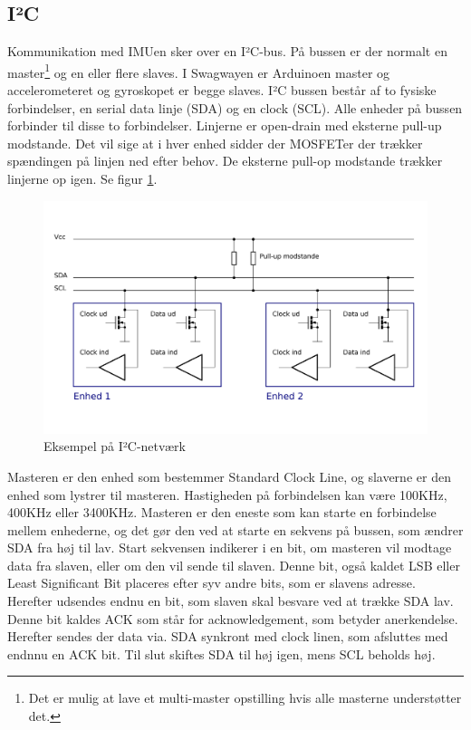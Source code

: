 \documentclass[a4paper,oneside,article,danish,table]{memoir}
\begin{document}
\subsection{I²C}
Kommunikation med IMUen sker over en I²C-bus. På bussen er der normalt en master\footnote{Det er mulig at lave et multi-master opstilling hvis alle masterne understøtter det.} og en eller flere slaves. I Swagwayen er Arduinoen master og accelerometeret og gyroskopet er begge slaves. I²C bussen består af to fysiske forbindelser, en serial data linje (SDA) og en clock (SCL). Alle enheder på bussen forbinder til disse to forbindelser. Linjerne er open-drain med eksterne pull-up modstande. Det vil sige at i hver enhed sidder der MOSFETer der trækker spændingen på linjen ned efter behov. De eksterne pull-op modstande trækker linjerne op igen. Se figur \ref{fig:i2cbasic}.
\begin{figure}[htbp]
  \centering
  \includegraphics[width=\textwidth]{pictures/I2Cbasic.pdf}
  \caption{Eksempel på I²C-netværk}
  \label{fig:i2cbasic}
\end{figure}
Masteren er den enhed som bestemmer Standard Clock Line, og slaverne er den enhed som lystrer til masteren. Hastigheden på forbindelsen kan være 100KHz, 400KHz eller 3400KHz. Masteren er den eneste som kan starte en forbindelse mellem enhederne, og det gør den ved at starte en sekvens på bussen, som ændrer SDA fra høj til lav. Start sekvensen indikerer i en bit, om masteren vil modtage data fra slaven, eller om den vil sende til slaven. Denne bit, også kaldet LSB eller Least Significant Bit placeres efter syv andre bits, som er slavens adresse. Herefter udsendes endnu en bit, som slaven skal besvare ved at trække SDA lav. Denne bit kaldes ACK som står for acknowledgement, som betyder anerkendelse. Herefter sendes der data via. SDA synkront med clock linen, som afsluttes med endnnu en ACK bit. Til slut skiftes SDA til høj igen, mens SCL beholds høj.  
\end{document}
